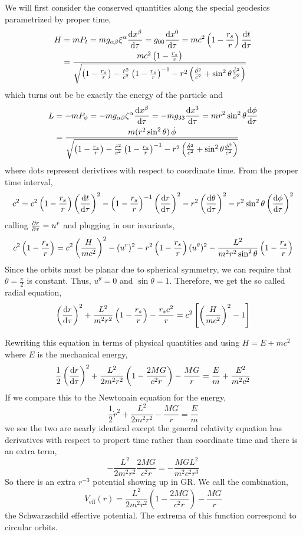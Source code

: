 \documentclass[11pt, a4paper]{article}
\begin{document}
We will first consider the conserved quantities along the special geodesics parametrized by proper time,
\begin{align*} 
H &= m P_t = m g_{\alpha \beta} \xi^\alpha \frac{\mathrm{d}x^\beta}{\mathrm{d}\tau} = g_{0 0} \frac{\mathrm{d}x^0}{\mathrm{d}\tau} = m c^2 \left(1 - \frac{r_s}{r} \right) \frac{\mathrm{d}t}{\mathrm{d}\tau}
\\
& = \frac{m c^2 \left(1 - \frac{r_s}{r} \right)}{\sqrt{\left(1 - \frac{r_s}{r} \right) - \frac{\dot{r}^2}{c^2} \left(1 - \frac{r_s}{r} \right)^{-1} - r^2 \left( \frac{\dot{\theta}^2}{c^2} + \sin^2{\theta} \frac{\dot{\phi}^2}{c^2} \right) }}
\end{align*}
which turns out be be exactly the energy of the particle and
\begin{align*} 
L & = - mP_\phi = -m g_{\alpha \beta} \zeta^\alpha \frac{\mathrm{d}x^\beta}{\mathrm{d}\tau} = - m g_{3 3} \frac{\mathrm{d}x^3}{\mathrm{d}\tau} = m r^2 \sin^2{\theta} \frac{\mathrm{d}\phi}{\mathrm{d}\tau} 
\\
& = \frac{m (r^2 \sin^2{\theta}) \, \dot{\phi}}{\sqrt{\left(1 - \frac{r_s}{r} \right) - \frac{\dot{r}^2}{c^2} \left(1 - \frac{r_s}{r} \right)^{-1} - r^2 \left( \frac{\dot{\theta}^2}{c^2} + \sin^2{\theta} \frac{\dot{\phi}^2}{c^2} \right) }} 
\end{align*}
where dots represent derivtives with respect to coordinate time. From the proper time interval,
\[ c^2 = c^2 \left(1 - \frac{r_s}{r} \right) \left( \frac{\mathrm{d}t}{\mathrm{d}\tau} \right)^2 - \left(1 - \frac{r_s}{r} \right)^{-1} \left( \frac{\mathrm{d}r}{\mathrm{d}\tau} \right)^2 - r^2 \left( \frac{\mathrm{d}\theta}{\mathrm{d}\tau} \right)^2 - r^2 \sin^2{\theta} \left( \frac{\mathrm{d}\phi}{\mathrm{d}\tau} \right)^2 \] 
calling $\frac{\partial{r}}{\partial{\tau}} = u^r$ and plugging in our invariants,
\[ c^2 \left(1 - \frac{r_s}{r} \right) = c^2 \left( \frac{H}{mc^2} \right)^2 - (u^r)^2 - r^2 \left(1 - \frac{r_s}{r} \right) (u^\theta)^2 - \frac{L^2}{m^2 r^2 \sin^2{\theta}} \left(1 - \frac{r_s}{r} \right)   \] 
Since the orbits must be planar due to spherical symmetry, we can require that $\theta = \frac{\pi}{2}$ is constant. Thus, $u^\theta = 0$ and $\sin{\theta} = 1$. Therefore, we get the so called radial equation,
\[ \left( \frac{\mathrm{d}r}{\mathrm{d}\tau} \right)^2 + \frac{L^2}{m^2 r^2} \left(1 - \frac{r_s}{r} \right) - \frac{r_s c^2}{r} = c^2 \left[ \left( \frac{H}{mc^2} \right)^2 - 1 \right] \]

Rewriting this equation in terms of physical quantities and using $H = E + mc^2$ where $E$ is the mechanical energy,
\[ \frac{1}{2} \left( \frac{\mathrm{d}r}{\mathrm{d}\tau} \right)^2 + \frac{L^2}{2 m^2 r^2} \left(1 - \frac{2 M G}{c^2 r} \right) - \frac{MG}{r} = \frac{E}{m} + \frac{E^2}{m^2 c^2} \] 
If we compare this to the Newtonain equation for the energy,
\[ \frac{1}{2} \dot{r}^2 + \frac{L^2}{2 m^2 r^2} - \frac{MG}{r} = \frac{E}{m} \]
we see the two are nearly identical except the general relativity equation has derivatives with respect to propert time rather than coordinate time and there is an extra term, 
\[ - \frac{L^2}{2 m^2 r^2} \frac{2 M G}{c^2 r} = - \frac{M G L^2}{m^2 c^2 r^3} \]
So there is an extra $r^{-3}$ potential showing up in GR. We call the combination,
\[ V_{\mathrm{eff}}(r) = \frac{L^2}{2 m^2 r^2} \left(1 - \frac{2 M G}{c^2 r} \right) - \frac{MG}{r} \]
the Schwarzschild effective potential. The extrema of this function correspond to circular orbits. 
\end{document}
